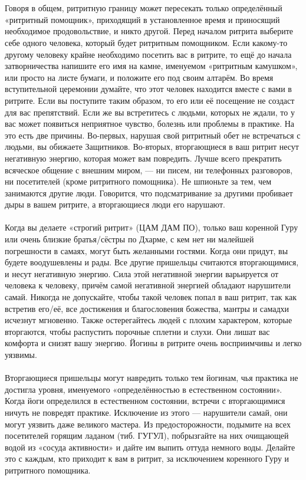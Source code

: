 \\ \\ Говоря в общем, ритритную границу может пересекать только определённый «ритритный помощник», приходящий в установленное время и приносящий необходимое продовольствие, и никто другой. Перед началом ритрита выберите себе одного человека, который будет ритритным помощником. Если какому-то другому человеку крайне необходимо посетить вас в ритрите, то ещё до начала затворничества напишите его имя на камне, именуемом «ритритным камушком», или просто на листе бумаги, и положите его под своим алтарём. Во время вступительной церемонии думайте, что этот человек находится вместе с вами в ритрите. Если вы поступите таким образом, то его или её посещение не создаст для вас препятствий. Если же вы встретитесь с людьми, которых не ждали, то у вас может появиться неприятное чувство, болезнь или проблемы в практике. На это есть две причины. Во-первых, нарушая свой ритритный обет не встречаться с людьми, вы обижаете Защитников. Во-вторых, вторгающиеся в ваш ритрит несут негативную энергию, которая может вам повредить. Лучше всего прекратить всяческое общение с внешним миром, — ни писем, ни телефонных разговоров, ни посетителей (кроме ритритного помощника). Не шпионьте за тем, чем занимаются другие люди. Говорится, что подсматривание за другими пробивает дыры в вашем ритрите, а вторгающиеся люди его нарушают.
\\ \\ Когда вы делаете «строгий ритрит» (ЦАМ ДАМ ПО), только ваш коренной Гуру или очень близкие братья/сёстры по Дхарме, с кем нет ни малейшей погрешности в самаях, могут быть желанными гостями. Когда они придут, вы будете воодушевле\-ны и рады. Все другие пришельцы считаются вторгающимися, и несут негативную энергию. Сила этой негативной энергии варьируется от человека к человеку, причём самой негативной энергией обладают нарушители самай. Никогда не допускайте, чтобы такой человек попал в ваш ритрит, так как встретив его/её, все достижения и благословения божества, мантры и самадхи исчезнут мгновенно. Также остерегайтесь людей с плохим характером, которые вторгаются, чтобы распустить порочные сплетни и слухи. Они лишат вас комфорта и снизят вашу энергию. Йогины в ритрите очень восприимчивы и легко уязвимы.
\\ \\ Вторгающиеся пришельцы могут навредить только тем йогинам, чья практика не достигла уровня, именуемого «определённостью в естественном состоянии». Когда йоги определился в естественном состоянии, встречи с вторгающимися ничуть не повредят практике. Исключение из этого — нарушители самай, они могут уязвить даже великого мастера. Из предосторожности, подымите на всех посетителей горящим ладаном (тиб. ГУГУЛ), побрызгайте на них очищающей водой из «сосуда активности» и дайте им выпить оттуда немного воды. Делайте это с каждым, кто приходит к вам в ритрит, за исключением коренного Гуру и ритритного помощника.

